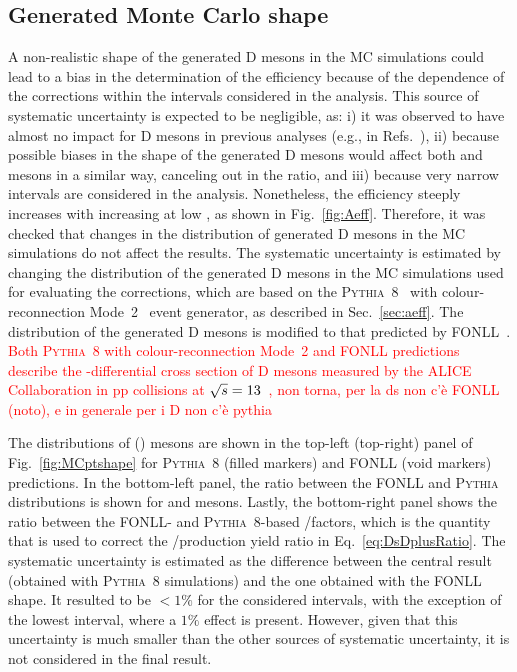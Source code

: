 \subsection{\texorpdfstring{Generated Monte Carlo \pt shape}{Generated Monte Carlo pT shape}}
A non-realistic \pt shape of the generated D mesons in the MC simulations could lead to a bias in the determination of the efficiency because of the \pt dependence of the \aeff corrections within the \pt intervals considered in the analysis. This source of systematic uncertainty is expected to be negligible, as: i) it was observed to have almost no impact for D mesons in previous analyses (e.g., in Refs.~\cite{ALICE:2021mgk,ALICE:2023sgl}), ii) because possible biases in the \pt shape of the generated D mesons would affect both \ds and \dpl mesons in a similar way, canceling out in the ratio, and iii) because very narrow \pt intervals are considered in the analysis. Nonetheless, the efficiency steeply increases with increasing \pt at low \pt, as shown in Fig.~\ref{fig:Aeff}. Therefore, it was checked that changes in the \pt distribution of generated D mesons in the MC simulations do not affect the results. The systematic uncertainty is estimated by changing the \pt distribution of the generated D mesons in the MC simulations used for evaluating the \aeff corrections, which are based on the \textsc{Pythia~8}~\cite{Bierlich:2022pfr} with colour-reconnection Mode~2~\cite{Christiansen:2015yqa} event generator, as described in Sec.~\ref{sec:aeff}. The \pt distribution of the generated D mesons is modified to that predicted by FONLL~\cite{Cacciari:1998it}. \textcolor{red}{Both \textsc{Pythia~8} with colour-reconnection Mode~2 and FONLL predictions describe the \pt-differential cross section of D mesons measured by the ALICE Collaboration in pp collisions at $\sqrt{s}=13$~\tev, non torna, per la ds non c'è FONLL (noto), e in generale per i D non c'è pythia}


The \pt distributions of \ds (\dpl) mesons are shown in the top-left (top-right) panel of Fig.~\ref{fig:MCptshape} for \textsc{Pythia}~8 (filled markers) and FONLL (void markers) predictions. In the bottom-left panel, the ratio between the FONLL and \textsc{Pythia} \pt distributions is shown for \ds and \dpl mesons. Lastly, the bottom-right panel shows the ratio between the FONLL- and \textsc{Pythia}~8-based \aeffpds/\aeffpdpl factors, which is the quantity that is used to correct the \ds/\dpl production yield ratio in Eq.~\ref{eq:DsDplusRatio}. The systematic uncertainty is estimated as the difference between the central result (obtained with \textsc{Pythia}~8 simulations) and the one obtained with the FONLL \pt shape. It resulted to be $<1\%$ for the considered \pt intervals, with the exception of the lowest interval, where a $1\%$ effect is present. However, given that this uncertainty is much smaller than the other sources of systematic uncertainty, it is not considered in the final result.

